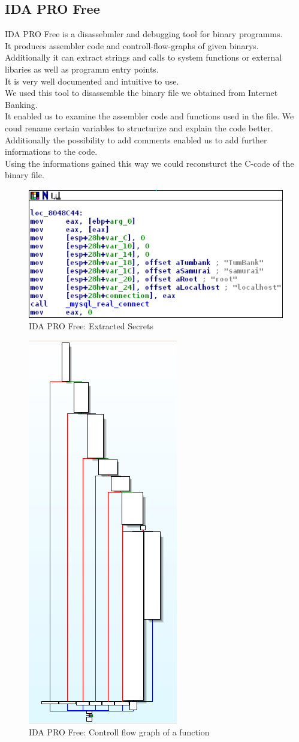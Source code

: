 \subsection{IDA PRO Free}
IDA PRO Free is a disassebmler and debugging tool for binary programms.\\
It produces assembler code and controll-flow-graphs of given binarys.\\
Additionally it can extract strings and calls to system functions or external libaries as well as programm entry points. \\
It is very well documented and intuitive to use. \\
We used this tool to disassemble the binary file  we obtained from Internet Banking. \\
It enabled us to examine the assembler code and functions used in the file. We coud rename certain variables to structurize and explain the code better. Additionally the possibility to add comments enabled us to add further informations to the code.\\
Using the informations gained this way we could reconsturct the C-code of the binary file.
\begin{figure}[ht]
	\centering
	\includegraphics[width=.8\linewidth]{figures/ida_db_info.png}
	\caption{IDA PRO Free: Extracted Secrets}
	\label{fig:ida_db_info}
\end{figure}
\begin{figure}[ht]
	\centering
	\includegraphics[width=.3\linewidth]{figures/ida_cfg_mysql_query_function.png}
	\caption{IDA PRO Free: Controll flow graph of a function}
	\label{fig:ida_controll_flow}
\end{figure}
